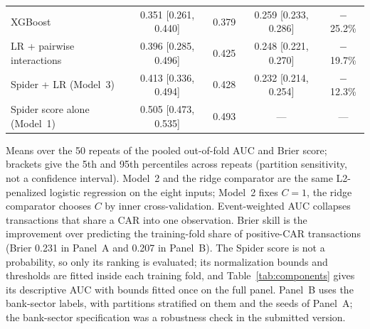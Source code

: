 \begin{table}[!t]
\begin{tabular*}{\textwidth}{@{\extracolsep{\fill}}lcccc}
XGBoost & 0.351 [0.261, 0.440] & 0.379 & 0.259 [0.233, 0.286] & $-$25.2\% \\
LR + pairwise interactions & 0.396 [0.285, 0.496] & 0.425 & 0.248 [0.221, 0.270] & $-$19.7\% \\
Spider + LR (Model~3) & 0.413 [0.336, 0.494] & 0.428 & 0.232 [0.214, 0.254] & $-$12.3\% \\
\midrule
Spider score alone (Model~1) & 0.505 [0.473, 0.535] & 0.493 & --- & --- \\
\bottomrule
\end{tabular*}
\par\vspace{2pt}\parbox{0.96\textwidth}{\scriptsize Means over the 50 repeats of the pooled out-of-fold AUC and Brier score;
brackets give the 5th and 95th percentiles across repeats (partition sensitivity, not a confidence interval).
Model~2 and the ridge comparator are the same L2-penalized logistic regression on the eight inputs; Model~2 fixes
$C=1$, the ridge comparator chooses $C$ by inner cross-validation. Event-weighted AUC collapses transactions that
share a CAR into one observation. Brier skill is the improvement over predicting the training-fold share of
positive-CAR transactions (Brier 0.231 in Panel~A and 0.207 in Panel~B). The Spider score is not a probability,
so only its ranking is evaluated; its normalization bounds and thresholds are fitted inside each training fold, and
Table~\ref{tab:components} gives its descriptive AUC with bounds fitted once on the full panel. Panel~B uses the bank-sector labels, with partitions stratified on them and the seeds of
Panel~A; the bank-sector specification was a robustness check in the submitted version.}
\end{table}
